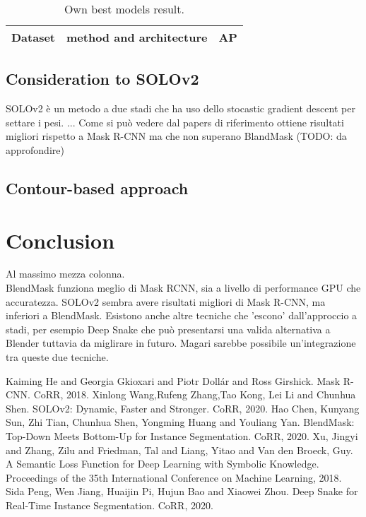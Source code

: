 \documentclass[10pt,twocolumn,letterpaper]{article}
\begin{document}
\begin{table}[H]
\scriptsize
\begin{center}
\begin{tabular}{|c|c|c|}
\hline
Dataset & method and architecture & AP\\
\hline\hline

\hline
\end{tabular}
\end{center}
\caption{Own best models result.}
\label{mytable_own_best_model}
\end{table}

\subsection{Consideration to SOLOv2}
SOLOv2 \`e un metodo a due stadi che ha uso dello stocastic gradient descent per settare i pesi. ... Come si pu\`o vedere dal papers di riferimento ottiene risultati migliori rispetto a Mask R-CNN ma che non superano BlandMask (TODO: da approfondire)



\subsection{Contour-based approach}



\section{Conclusion}
Al massimo mezza colonna.\\
BlendMask funziona meglio di Mask RCNN, sia a livello di performance GPU che accuratezza. SOLOv2 sembra avere risultati migliori di Mask R-CNN, ma inferiori a BlendMask. Esistono anche altre tecniche che 'escono' dall'approccio a stadi, per esempio Deep Snake che pu\`o presentarsi una valida alternativa a Blender tuttavia da miglirare in futuro. Magari sarebbe possibile un'integrazione tra queste due tecniche.

\begin{thebibliography}{1}
Kaiming He and Georgia Gkioxari and Piotr Dollár and Ross Girshick.
Mask R-CNN. CoRR, 2018.
Xinlong Wang,Rufeng Zhang,Tao Kong, Lei Li and Chunhua Shen.
SOLOv2: Dynamic, Faster and Stronger. CoRR, 2020.
Hao Chen, Kunyang Sun, Zhi Tian, Chunhua Shen, Yongming Huang and Youliang Yan.
BlendMask: Top-Down Meets Bottom-Up for Instance Segmentation. CoRR, 2020.
Xu, Jingyi and Zhang, Zilu and Friedman, Tal and Liang, Yitao and Van den Broeck, Guy.
A Semantic Loss Function for Deep Learning with Symbolic Knowledge. Proceedings of the 35th International Conference on Machine Learning, 2018.
Sida Peng, Wen Jiang, Huaijin Pi, Hujun Bao and Xiaowei Zhou.
Deep Snake for Real-Time Instance Segmentation. CoRR, 2020.

\end{thebibliography}
\end{document}
